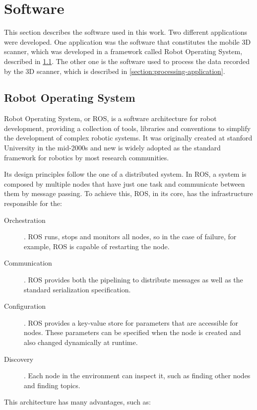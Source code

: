 \section{Software}
\label{section:software}

This section describes the software used in this work. Two different applications were developed. One application was the software that constitutes the mobile 3D scanner, which was developed in a framework called Robot Operating System, described in \cref{section:ros}. The other one is the software used to process the data recorded by the 3D scanner, which is described in \cref{section:processing-application}.

\subsection{Robot Operating System}
\label{section:ros}

Robot Operating System, or ROS, is a software architecture for robot development, providing a collection of tools, libraries and conventions to simplify the development of complex robotic systems. It was originally created at stanford University in the mid-2000s and new is widely adopted as the standard framework for robotics by most research communities.

Its design principles follow the one of a distributed system. In ROS, a system is composed by multiple nodes that have just one task and communicate between them by message passing. To achieve this, ROS, in its core, has the infrastructure responsible for the:

\begin{description}
    \item[Orchestration]. ROS runs, stops and monitors all nodes, so in the case of failure, for example, ROS is capable of restarting the node.
    \item[Communication]. ROS provides both the pipelining to distribute messages as well as the standard serialization specification.
    \item[Configuration]. ROS provides a key-value store for parameters that are accessible for nodes. These parameters can be specified when the node is created and also changed dynamically at runtime.
    \item[Discovery]. Each node in the environment can inspect it, such as finding other nodes and finding topics.
\end{description}

This architecture has many advantages, such as:

